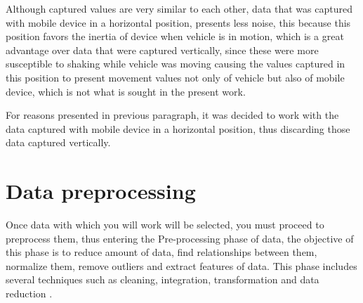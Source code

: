 \vspace{5mm} %

Although captured values are very similar to each other, data that was captured with mobile device in a horizontal position, presents less noise, this because this position favors the inertia of device when  vehicle is in motion, which is a great advantage over data that were captured vertically, since these were more susceptible to shaking while vehicle was moving causing the values captured in this position to present movement values not only of vehicle but also of mobile device, which is not what is sought in the present work.

\vspace{5mm} %

For reasons presented in previous paragraph, it was decided to work with the data captured with mobile device in a horizontal position, thus discarding those data captured vertically.

\section{Data preprocessing}

Once data with which you will work will be selected, you must proceed to preprocess them, thus entering the Pre-processing phase of data, the objective of this phase is to reduce amount of data, find relationships between them, normalize them, remove outliers and extract features of data. This phase includes several techniques such as cleaning, integration, transformation and data reduction \cite{Reference38}.

